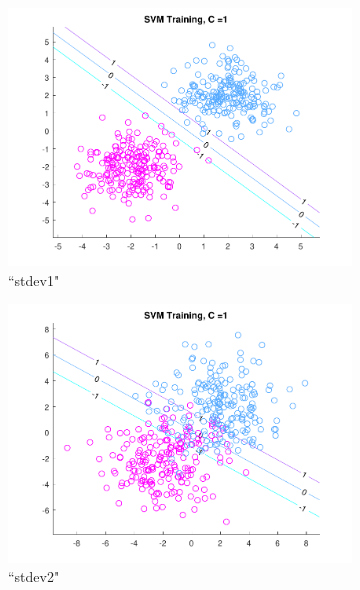 \begin{figure}[h!]
\centering
    \begin{subfigure}[b]{0.22\textwidth}
	\includegraphics[scale=0.4]{figures/hw2_2_stdev1_a_1.pdf}
	\caption{``stdev1"}\label{fig:svm_data_stdev1a}
    \end{subfigure}
    \quad
    \begin{subfigure}[b]{0.22\textwidth}
	\includegraphics[scale=0.4]{figures/hw2_2_stdev2_a_1.pdf}
	\caption{``stdev2"}\label{fig:svm_data_stdev2a}
    \end{subfigure}
    \quad
    \begin{subfigure}[b]{0.22\textwidth}

\end{subfigure}
\end{figure}
